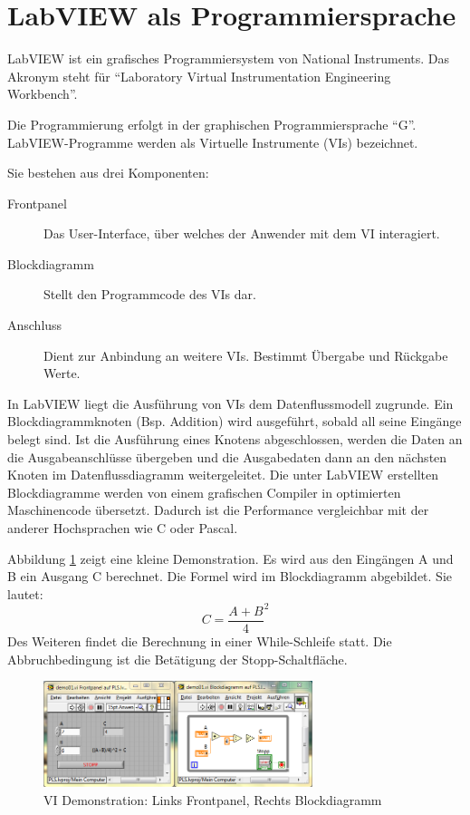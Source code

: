 \section{LabVIEW als Programmiersprache}
	\label{sec:labview}
	
LabVIEW ist ein grafisches Programmiersystem von National Instruments. Das Akronym steht für "`Laboratory Virtual Instrumentation Engineering Workbench"'.

Die Programmierung erfolgt in der graphischen Programmiersprache "`G"'.  LabVIEW-Programme werden als Virtuelle Instrumente (VIs) bezeichnet. \cite{ni-tuto}

Sie bestehen aus drei Komponenten: 
\begin{description}
	\item[Frontpanel] Das User-Interface, über welches der Anwender mit dem VI interagiert.
	\item[Blockdiagramm] Stellt den Programmcode des VIs dar.
	\item[Anschluss] Dient zur Anbindung an weitere VIs. Bestimmt Übergabe und Rückgabe Werte. 
\end{description}

In LabVIEW liegt die Ausführung von VIs dem Datenflussmodell zugrunde. Ein Blockdiagrammknoten (Bsp. Addition) wird ausgeführt, sobald all seine Eingänge belegt sind. Ist die Ausführung eines Knotens abgeschlossen, werden die Daten an die Ausgabeanschlüsse übergeben und die Ausgabedaten dann an den nächsten Knoten im Datenflussdiagramm weitergeleitet. \cite{LVT}
Die unter LabVIEW erstellten Blockdiagramme werden von einem grafischen Compiler in optimierten Maschinencode übersetzt. Dadurch ist die Performance vergleichbar mit der anderer Hochsprachen wie C oder Pascal. \cite{ni-compiler}

Abbildung \ref{fig:demo01} zeigt eine kleine Demonstration. Es wird aus den Eingängen A und B ein Ausgang C berechnet. Die Formel wird im Blockdiagramm abgebildet. Sie lautet:
\[ C = \frac{A+B}{4}^{2} \]
Des Weiteren findet die Berechnung in einer While-Schleife statt. Die Abbruchbedingung ist die Betätigung der Stopp-Schaltfläche. 

	\begin{figure}%
	\centering
		\includegraphics[width=0.7\textwidth]{Pics/demo01.png}
	\caption{VI Demonstration: Links Frontpanel, Rechts Blockdiagramm}
	\label{fig:demo01}
	\end{figure}

